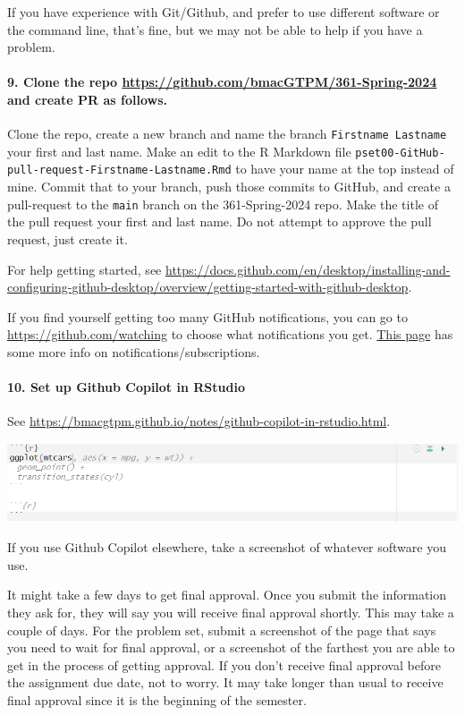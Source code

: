 \documentclass[
]{article}
\begin{document}
If you have experience with Git/Github, and prefer to use different
software or the command line, that's fine, but we may not be able to
help if you have a problem.

\paragraph{\texorpdfstring{9. Clone the repo
\url{https://github.com/bmacGTPM/361-Spring-2024} and create PR as
follows.}{9. Clone the repo https://github.com/bmacGTPM/361-Spring-2024 and create PR as follows.}}\label{clone-the-repo-httpsgithub.combmacgtpm361-spring-2024-and-create-pr-as-follows.}

Clone the repo, create a new branch and name the branch
\texttt{Firstname\ Lastname} your first and last name. Make an edit to
the R Markdown file
\texttt{pset00-GitHub-pull-request-Firstname-Lastname.Rmd} to have your
name at the top instead of mine. Commit that to your branch, push those
commits to GitHub, and create a pull-request to the \texttt{main} branch
on the 361-Spring-2024 repo. Make the title of the pull request your
first and last name. Do not attempt to approve the pull request, just
create it.

For help getting started, see
\url{https://docs.github.com/en/desktop/installing-and-configuring-github-desktop/overview/getting-started-with-github-desktop}.

If you find yourself getting too many GitHub notifications, you can go
to \url{https://github.com/watching} to choose what notifications you
get.
\href{https://docs.github.com/en/account-and-profile/managing-subscriptions-and-notifications-on-github/managing-subscriptions-for-activity-on-github/managing-your-subscriptions}{This
page} has some more info on notifications/subscriptions.

\paragraph{10. Set up Github Copilot in
RStudio}\label{set-up-github-copilot-in-rstudio}

See
\url{https://bmacgtpm.github.io/notes/github-copilot-in-rstudio.html}.

\includegraphics{img/github copilot ss.png}

If you use Github Copilot elsewhere, take a screenshot of whatever
software you use.

It might take a few days to get final approval. Once you submit the
information they ask for, they will say you will receive final approval
shortly. This may take a couple of days. For the problem set, submit a
screenshot of the page that says you need to wait for final approval, or
a screenshot of the farthest you are able to get in the process of
getting approval. If you don't receive final approval before the
assignment due date, not to worry. It may take longer than usual to
receive final approval since it is the beginning of the semester.
\end{document}
